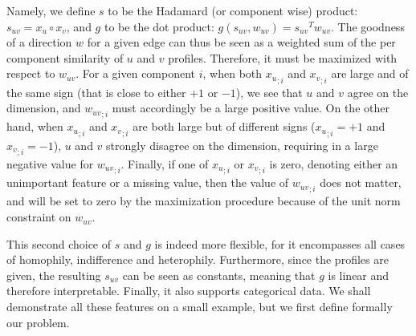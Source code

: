 Namely, we define $s$ to be the Hadamard (or component wise) product: $s_{uv} = x_u \circ x_v$, and
$g$ to be the dot product: $g(s_{uv}, w_{uv}) = {s_{uv}}^T w_{uv}$. The goodness of a direction $w$
for a given edge can thus be seen as a weighted sum of the per component similarity of $u$ and $v$
profiles. Therefore, it must be maximized with respect to $w_{uv}$. For a given component $i$, when
both ${x_u}_{;i}$ and ${x_v}_{;i}$ are large and of the same sign (that is close to either $+1$ or
$-1$), we see that $u$ and $v$ agree on the \ith{} dimension, and ${w_{uv}}_{;i}$ must accordingly
be a large positive value. On the other hand, when ${x_u}_{;i}$ and ${x_v}_{;i}$ are both large but
of different signs (\eg ${x_u}_{;i} = +1$ and ${x_v}_{;i} = -1$), $u$ and $v$ strongly disagree on
the \ith{} dimension, requiring in a large negative value for ${w_{uv}}_{;i}$.  Finally, if one of
${x_u}_{;i}$ or ${x_v}_{;i}$ is zero, denoting either an unimportant feature or a missing value,
then the value of ${w_{uv}}_{;i}$ does not matter, and will be set to zero by the maximization
procedure because of the unit norm constraint on $w_{uv}$.

\iffalse
\begin{aside}
When $s$ is a distance, and therefore positive, we impose $w_{uv}\geq 0$. A link $(u,v)$ is then
well explained by $w_{uv}$ when observed differences along this direction are small. More precisely,
when the quantity ${s_{uv}}^T w_{uv}$ is close to zero. Because $w_{uv}$ is unit norm, the \ith{}
component of $w_{uv}$ should be large when the \ith{} feature of $x_u$ and $x_v$ are close. Hence, a
null value for a component $i$ of $s_{uv}$ should not mean anything else than $u$ and $v$ share a
known and similar feature $i$ (\eg{} the unknown value should be different from $0$). When $s$ is
the difference $x_u - x_v$, it can be negative and the same reasoning can be applied, but with
$w_{uv}\in [-1,1]^d$ and a link value of $\left({s_{uv}}^T w_{uv}\right)^2$.

An alternative is to consider that the combination is a similarity. Links are created when the
observed similarity is high. Again, if $s$ is positive, it seems reasonable to impose that
$w_{uv}\geq0$ (and if $s$ can be negative, then $w_{uv}$ should be in $[-1,1]$). One main advantage
of similarities is maybe to avoid (or minimize) problems with missing values setting them to 0.
\end{aside}
\fi

\medskip

This second choice of $s$ and $g$ is indeed more flexible, for it encompasses all cases of
homophily, indifference and heterophily. Furthermore, since the profiles are given, the resulting
$s_{uv}$ can be seen as constants, meaning that $g$ is linear and therefore interpretable. Finally,
it also supports categorical data. We shall demonstrate all these features on a small example,
but we first define formally our problem.

